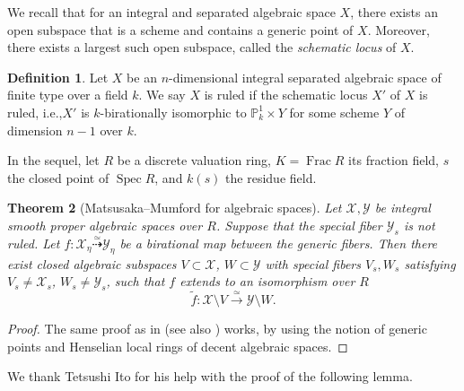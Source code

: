 \documentclass[11pt,reqno,oneside]{amsart}
\numberwithin{equation}{section}
\newtheorem{theorem}{Theorem}[section]
\theoremstyle{definition}
\newtheorem{definition}[theorem]{Definition}
\DeclareMathOperator{\Spec}{Spec}
\DeclareMathOperator{\Frac}{Frac}
\newcommand{\PP}{\mathbb{P}}
\begin{document}
We recall that for an integral and separated algebraic space $X$, there exists an open subspace that is a scheme and contains a generic point of $X$. Moreover, there exists a largest such open subspace, called the \textit{schematic locus} of $X$.
\begin{definition}
\label{def:Ruled}
Let $X$ be an $n$-dimensional integral separated algebraic space of finite type over a field $k$.
We say $X$ is ruled if the schematic locus $X'$ of $X$ is ruled, i.e.,$X'$ is $k$-birationally isomorphic to $\PP^{1}_{k} \times Y$ for some scheme $Y$ of dimension $n-1$ over $k$. 
\end{definition}

In the sequel,  let $R$ be a discrete valuation ring, $K = \Frac R$ its fraction field, $s$ the closed point of $\Spec R$, and $k(s)$ the residue field. 

\begin{theorem}[Matsusaka--Mumford for algebraic spaces]
\label{ClosedSubset}
Let $\mathcal{X}, \mathcal{Y}$ be integral smooth proper algebraic spaces over $R$.
Suppose that the special fiber $\mathcal{Y}_{s}$ is not ruled.
Let $f \colon \mathcal{X}_{\eta} \overset{\simeq}{\dashrightarrow} \mathcal{Y}_{\eta}$
be a birational map between the generic fibers.
Then there exist closed algebraic subspaces
$V \subset \mathcal{X}$, $W \subset \mathcal{Y}$
with special fibers $V_{s}, W_{s}$ satisfying $V_{s} \neq \mathcal{X}_{s}$, $W_{s} \neq \mathcal{Y}_{s}$,
such that
$f$ extends to an isomorphism over $R$
\[
  \widetilde{f} \colon 
  \mathcal{X} \setminus V \overset{\simeq}{\to}
  \mathcal{Y} \setminus W.
\]
\end{theorem}
\begin{proof}
The same proof as in \cite[Theorem 1]{MM64} (see also \cite[Theorem 5.4]{Matsumoto2015}) works, by using the notion of generic points and Henselian local rings of decent algebraic spaces.
\end{proof}

We thank Tetsushi Ito for his help with the proof of the following lemma.
\end{document}
